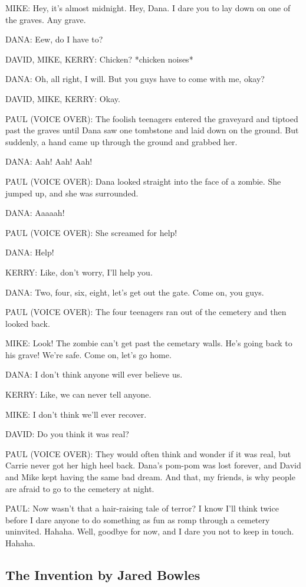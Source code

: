 MIKE:
Hey, it's almost midnight.
Hey, Dana.
I dare you to lay down on one of the graves.
Any grave.

DANA:
Eew, do I have to?

DAVID, MIKE, KERRY:
Chicken?
*chicken noises*

DANA:
Oh, all right, I will.
But you guys have to come with me, okay?

DAVID, MIKE, KERRY:
Okay.

PAUL (VOICE OVER):
The foolish teenagers entered the graveyard and tiptoed past the graves until Dana saw one tombstone and laid down on the ground.
But suddenly, a hand came up through the ground and grabbed her.

DANA:
Aah! Aah! Aah!

PAUL (VOICE OVER):
Dana looked straight into the face of a zombie.
She jumped up, and she was surrounded.

DANA:
Aaaaah!

PAUL (VOICE OVER):
She screamed for help!

DANA:
Help!

KERRY:
Like, don't worry, I'll help you.

DANA:
Two, four, six, eight, let's get out the gate.
Come on, you guys.

PAUL (VOICE OVER):
The four teenagers ran out of the cemetery and then looked back.

MIKE:
Look!
The zombie can't get past the cemetary walls.
He's going back to his grave!
We're safe.
Come on, let's go home.

DANA:
I don't think anyone will ever believe us.

KERRY:
Like, we can never tell anyone.

MIKE:
I don't think we'll ever recover.

DAVID:
Do you think it was real?

PAUL (VOICE OVER):
They would often think and wonder if it was real, but Carrie never got her high heel back.
Dana's pom-pom was lost forever, and David and Mike kept having the same bad dream.
And that, my friends, is why people are afraid to go to the cemetery at night.

PAUL:
Now wasn't that a hair-raising tale of terror?
I know I'll think twice before I dare anyone to do something as fun as romp through a cemetery uninvited.
Hahaha.
Well, goodbye for now, and I dare you not to keep in touch.
Hahaha.

\subsection{The Invention by Jared Bowles}

